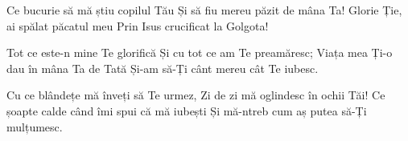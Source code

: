 \beginverse
Ce bucurie să mă știu copilul Tău
Și să fiu mereu păzit de mâna Ta!
Glorie Ție, ai spălat păcatul meu
Prin Isus crucificat la Golgota!
\endverse

\beginchorus
Tot ce este-n mine Te glorifică
Și cu tot ce am Te preamăresc;
Viața mea Ți-o dau în mâna Ta de Tată
Și-am să-Ți cânt mereu cât Te iubesc.
\endchorus

\beginverse
Cu ce blândețe mă înveți să Te urmez,
Zi de zi mă oglindesc în ochii Tăi!
Ce șoapte calde când îmi spui că mă iubești
Și mă-ntreb cum aș putea să-Ți mulțumesc.
\endverse
\endsong